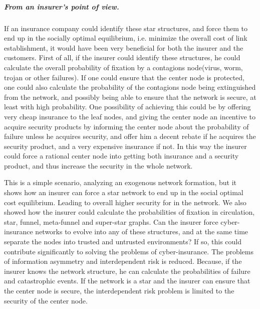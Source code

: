 \subparagraph{From an insurer's point of view.}
If an insurance company could identify these star structures, and force them to end up in the socially optimal equilibrium, i.e. minimize the overall cost of link establishment, it would have been very beneficial for both the insurer and the customers.
First of all, if the insurer could identify these structures, he could calculate the overall probability of fixation by a contagions node(virus, worm, trojan or other failures). If one could ensure that the center node is protected, one could also calculate the probability of the contagions node being extinguished from the network, and possibly being able to ensure that the network is secure, at least with high probability. 
One possibility of achieving this could be by offering very cheap insurance to the leaf nodes, and giving the center node an incentive to acquire security products by informing the center node about the probability of failure unless he acquires security, and offer him a decent rebate if he acquires the security product, and a very expensive insurance if not. In this way the insurer could force a rational center node into getting both insurance and a security product, and thus increase the security in the whole network.

This is a simple scenario, analyzing an exogenous network formation, but it shows how an insurer can force a star network to end up in the social optimal cost equilibrium. Leading to overall higher security for in the network. We also showed how the insurer could calculate the probabilities of fixation in circulation, star, funnel, meta-funnel and super-star graphs.  Can the insurer force cyber-insurance networks to evolve into any of these structures, and at the same time separate the nodes into trusted and untrusted environments? 
If so, this could contribute significantly to solving the problems of cyber-insurance. The problems of information asymmetry and interdependent risk is reduced. Because, if the insurer knows the network structure, he can calculate the probabilities of failure and catastrophic events. If the network is a star and the insurer can ensure that the center node is secure, the interdependent risk problem is limited to the security of the center node.


